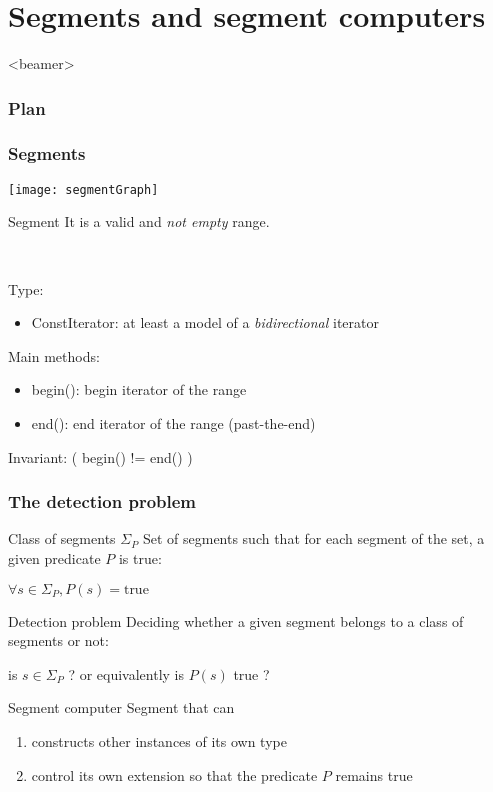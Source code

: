 


\section{Segments and segment computers}

  \begin{frame}<beamer>
    \frametitle{Plan}
    \tableofcontents[sectionstyle=show/shaded]
  \end{frame}

\begin{frame}
  \frametitle{Segments}
 

   \texttt{[image: segmentGraph]}

  \begin{block}{Segment}
It is a valid and \emph{not empty} range. 

~

Type:
\begin{itemize}
  \item ConstIterator: at least a model of a \emph{bidirectional} iterator
\end{itemize}

Main methods:
\begin{itemize}
  \item begin(): begin iterator of the range
  \item end(): end iterator of the range (past-the-end)
\end{itemize}

Invariant: ( begin() != end() )
  \end{block}

\end{frame}

\begin{frame}
  \frametitle{The detection problem}
 
  \begin{block}{Class of segments $\Sigma_P$}
Set of segments such that for each segment of the set, 
a given predicate $P$ is true: 

$\forall s \in \Sigma_P,  P(s) = \text{true}$ 
  \end{block}

  \begin{block}{Detection problem}
Deciding whether a given segment 
belongs to a class of segments or not:  

is $s \in \Sigma_P$ ? or equivalently is $P(s)$ true ? 
  \end{block}

  \begin{block}{Segment computer}
Segment that can 
\begin{enumerate}
 \item constructs other instances of its own type
 \item control its own extension so that the predicate $P$ remains true
\end{enumerate}
  \end{block}

\end{frame}

